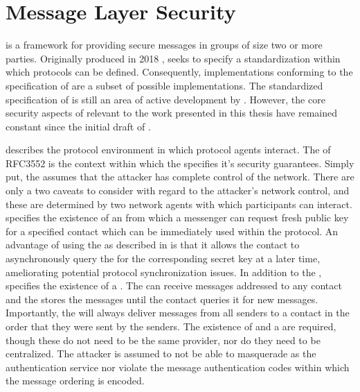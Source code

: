 \hypertarget{sec:message-layer-security}{%
\section{Message Layer Security}\label{sec:message-layer-security}}

 \autocite{Omara2020} is a framework for providing secure messages in groups of size two or more parties.
Originally produced in 2018 \autocite{ietf-mls-architecture-02},  seeks to specify a standardization within which  protocols can be defined.
Consequently, implementations conforming to the specification of  are a subset of possible  implementations.
The standardized specification of  is still an area of active development by .
However, the core security aspects of  relevant to the work presented in this thesis have remained constant since the initial draft of .

 describes the protocol environment in which protocol agents interact.
The  of RFC3552 \autocite{rescorla2003rfc3552} is the context within which the  specifies it's security guarantees.
Simply put, the  assumes that the attacker has complete control of the network.
There are only a two caveats to consider with regard to the attacker's network control, and these are determined by two network agents with which  participants can interact.
 specifies the existence of an  \autocite{perlman1999overview} from which a messenger can request fresh public key for a specified contact which can be immediately used within the  protocol.
An advantage of using the  as described in  is that it allows the contact to asynchronously query the  for the corresponding secret key at a later time, ameliorating potential protocol synchronization issues.
In addition to the ,  specifies the existence of a  \autocite{sekiba1998design}.
The  can receive messages addressed to any contact and the  stores the messages until the contact queries it for new messages.
Importantly, the  will always deliver messages from all senders to a contact in the order that they were sent by the senders.
The existence of  and a  are required, though these do not need to be the same provider, nor do they need to be centralized.
The attacker is assumed to not be able to masquerade as the authentication service nor violate the message authentication codes \autocite{krawczyk1997hmac} within which the message ordering is encoded.

